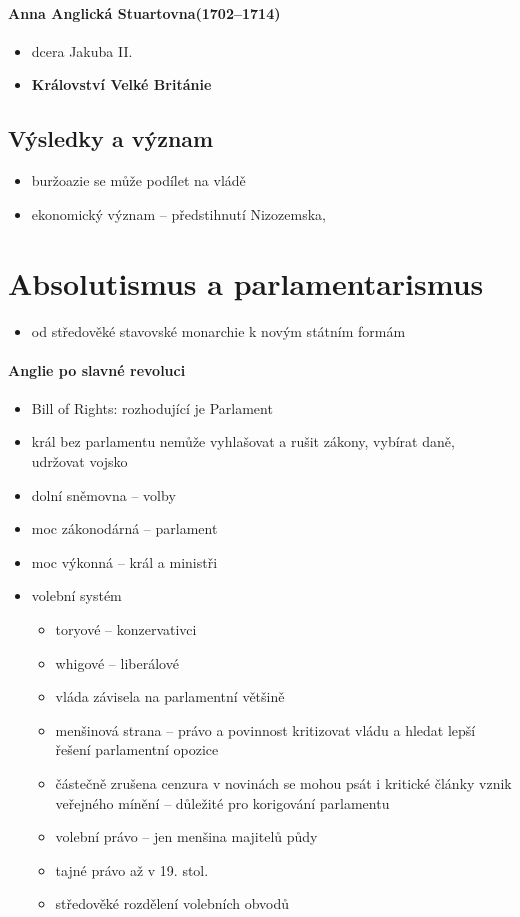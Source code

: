 \paragraph{Anna Anglická Stuartovna(1702--1714)}
\begin{itemize}
\item dcera Jakuba II.
\item {} \ra \textbf{Království Velké Británie}
\end{itemize}

\subsection{Výsledky a význam}
\begin{itemize}
\item buržoazie se může podílet na vládě
\item ekonomický význam -- předstihnutí Nizozemska, 
\end{itemize}



\section{Absolutismus a parlamentarismus}
\begin{itemize}
\item od středověké stavovské monarchie k novým státním formám
\end{itemize}

\paragraph{Anglie po slavné revoluci}
\begin{itemize}
\item Bill of Rights: rozhodující je Parlament
\item král bez parlamentu nemůže vyhlašovat a rušit zákony, vybírat daně, udržovat vojsko
\item dolní sněmovna -- volby
\item moc zákonodárná -- parlament
\item moc výkonná -- král a ministři
\item volební systém
	\begin{itemize}
	\item toryové -- konzervativci
	\item whigové -- liberálové
	\item vláda závisela na parlamentní většině
	\item menšinová strana -- právo a povinnost kritizovat vládu a hledat lepší řešení \ra parlamentní opozice
	\item částečně zrušena cenzura \ra v novinách se mohou psát i kritické články \ra vznik veřejného mínění  -- důležité pro korigování parlamentu
	\item volební právo -- jen menšina majitelů půdy
	\item tajné právo až v 19. stol.
	\item středověké rozdělení volebních obvodů
	\end{itemize}
\end{itemize}


